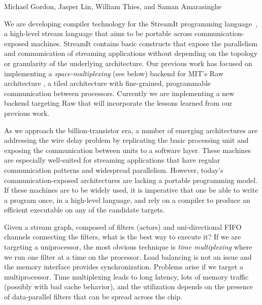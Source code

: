 \documentclass{csailabstractbook}
\begin{document}


         {Michael Gordon, Jasper Lin, William Thies, and Saman Amarasinghe}


We are developing compiler technology for the StreamIt programming
language~\cite{streamitcc}, a high-level stream language that aims to
be portable across communication-exposed machines.  StreamIt contains
basic constructs that expose the parallelism and communication of
streaming applications without depending on the topology or
granularity of the underlying architecture.  Our previous work
\cite{streamit-asplos} has focused on 
implementing a {\it space-multiplexing} (see below) backend for
MIT's Raw architecture \cite{raw}, a tiled architecture 
with fine-grained, programmable communication between processors.
Currently we are implementing a new backend targeting Raw that will
incorporate the lessons learned from our previous work.

As we approach the billion-transistor era, a number of emerging
architectures are addressing the wire delay problem by replicating the
basic processing unit and exposing the communication between units to
a software layer.  These machines are especially well-suited for
streaming applications that have regular communication patterns and
widespread parallelism.  However, today's communication-exposed
architectures are lacking a portable programming model.  If these
machines are to be widely used, it is imperative that one be able to
write a program once, in a high-level language, and rely on a compiler
to produce an efficient executable on any of the candidate targets.


Given a stream graph, composed of filters (actors) and uni-directional
FIFO channels connecting the filters, what is the best way to execute
it?  If we are targeting a uniprocessor, the most obvious technique is
{\it time multiplexing} where we run one filter at a time on the
processor.  Load balancing is not an issue and the memory interface
provides synchronization.  Problems arise if we target a
multiprocessor.  Time multiplexing leads to long latency, lots of
memory traffic (possibly with bad cache behavior), and the utilization
depends on the presence of data-parallel filters that can be spread
across the chip.
\end{document}
